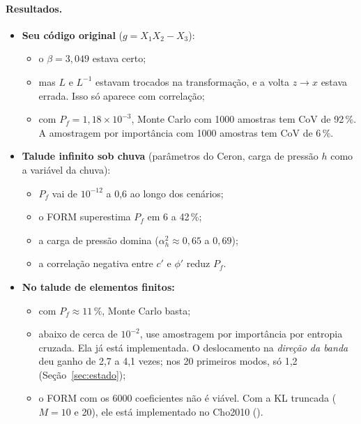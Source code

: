 \paragraph{Resultados.}
\begin{itemize}
  \item \textbf{Seu código original} ($g = X_1X_2 - X_3$):
    \begin{itemize}
      \item o $\beta = 3{,}049$ estava certo;
      \item mas $L$ e $L^{-1}$ estavam trocados na transformação, e a volta $z \to x$ estava errada. Isso só aparece
        com correlação;
      \item com $P_f = 1{,}18\times10^{-3}$, Monte Carlo com 1000 amostras tem CoV de 92\,\%. A amostragem por
        importância com 1000 amostras tem CoV de 6\,\%.
    \end{itemize}
  \item \textbf{Talude infinito sob chuva} (parâmetros do Ceron, carga de pressão $h$ como a variável da chuva):
    \begin{itemize}
      \item $P_f$ vai de $10^{-12}$ a 0,6 ao longo dos cenários;
      \item o FORM superestima $P_f$ em 6 a 42\,\%;
      \item a carga de pressão domina ($\alpha_h^2 \approx 0{,}65$ a $0{,}69$);
      \item a correlação negativa entre $c'$ e $\phi'$ reduz $P_f$.
    \end{itemize}
  \item \textbf{No talude de elementos finitos:}
    \begin{itemize}
      \item com $P_f \approx 11\,\%$, Monte Carlo basta;
      \item abaixo de cerca de $10^{-2}$, use amostragem por importância por entropia cruzada. Ela já está implementada.
        O deslocamento na \emph{direção da banda} deu ganho de 2,7 a 4,1 vezes; nos 20 primeiros modos, só 1,2
        (Seção~\ref{sec:estado});
      \item o FORM com os 6000 coeficientes não é viável. Com a KL truncada ($M = 10$ e 20), ele está implementado no
        Cho2010 ().
    \end{itemize}
\end{itemize}
